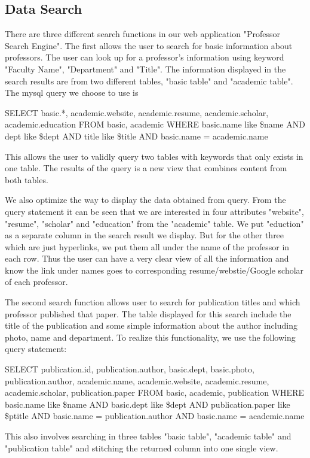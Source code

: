 \documentclass[authoryear,preprint,final,12pt]{elsarticle}
\begin{document}
\subsection{Data Search}
There are three different search functions in our web application "Professor Search Engine". The first allows the user to search for basic information about professors. The user can look up for a professor's information using keyword "Faculty Name", "Department" and "Title". The information displayed in the search results are from two different tables, "basic table" and "academic table". The mysql query we choose to use is 
\begin{displayquote}
    SELECT basic.*, academic.website, academic.resume, academic.scholar, academic.education FROM basic, academic WHERE basic.name like \$name AND dept like \$dept AND title like \$title AND basic.name = academic.name 
\end{displayquote}
This allows the user to validly query two tables with keywords that only exists in one table. The results of the query is a new view that combines content from both tables. 

We also optimize the way to display the data obtained from query. From the query statement it can be seen that we are interested in four attributes "website", "resume", "scholar" and "education" from the "academic" table. We put "eduction" as a separate column in the search result we display. But for the other three which are just hyperlinks, we put them all under the name of the professor in each row. Thus the user can have a very clear view of all the information and know the link under names goes to corresponding resume/webstie/Google scholar of each professor.

The second search function allows user to search for publication titles and which professor published that paper. The table displayed for this search include the title of the publication and some simple information about the author including photo, name and department. To realize this functionality, we use the following query statement:
\begin{displayquote}
    SELECT publication.id, publication.author, basic.dept, basic.photo, publication.author, academic.name, academic.website, academic.resume, academic.scholar, publication.paper FROM basic, academic, publication WHERE basic.name like \$name AND basic.dept like \$dept AND publication.paper like \$ptitle AND basic.name = publication.author AND basic.name = academic.name 
\end{displayquote}
This also involves searching in three tables "basic table", "academic table" and "publication table" and stitching the returned column into one single view.
\end{document}

